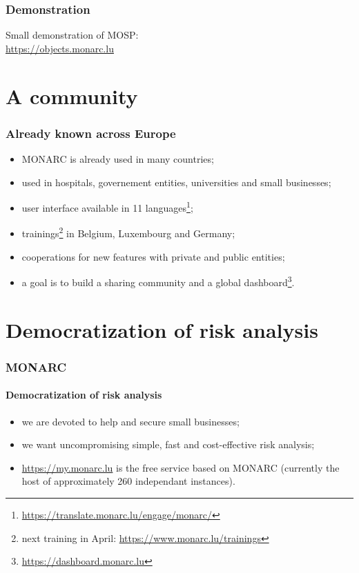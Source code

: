\documentclass[]{beamer}
\begin{document}
\begin{frame}
  \frametitle{Demonstration}
  Small demonstration of MOSP:\\
  \url{https://objects.monarc.lu}
\end{frame}


\section{A community}
\begin{frame}
  \frametitle{Already known across Europe}
  \begin{center}
    \begin{itemize}
      \item MONARC is already used in many countries;
      \item used in hospitals, governement entities, universities and small businesses;
      \item user interface available in 11 languages\footnote{\url{https://translate.monarc.lu/engage/monarc/}};
      \item trainings\footnote{next training in April: \url{https://www.monarc.lu/trainings}} in Belgium, Luxembourg and Germany;
      \item cooperations for new features with private and public entities;
      \item a goal is to build a sharing community and a global dashboard\footnote{\url{https://dashboard.monarc.lu}}.
    \end{itemize}
  \end{center}
\end{frame}


\section{Democratization of risk analysis}
\begin{frame}
  \frametitle{MONARC}
  \framesubtitle{Democratization of risk analysis}
  \begin{center}
    \begin{itemize}
      \item we are devoted to help and secure small businesses;
      \item we want uncompromising simple, fast and cost-effective risk analysis;
      \item \url{https://my.monarc.lu} is the free service based on MONARC (currently the host of approximately 260 independant instances).
    \end{itemize}
  \end{center}
\end{frame}
\end{document}
